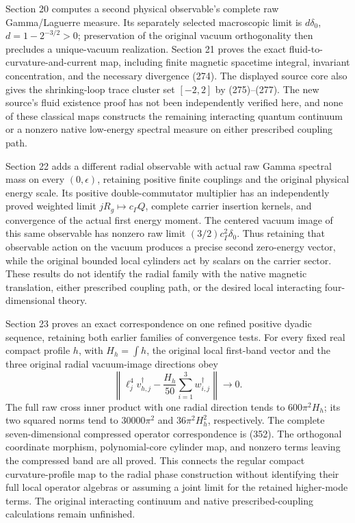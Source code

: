 \documentclass[
  11pt,
]{article}
\begin{document}
Section 20 computes a second physical observable's complete raw
Gamma/Laguerre measure. Its separately selected macroscopic limit is
\(d\delta_0\), \(d=1-2^{-3/2}>0\); preservation of the original vacuum
orthogonality then precludes a unique-vacuum realization. Section 21
proves the exact fluid-to-curvature-and-current map, including finite
magnetic spacetime integral, invariant concentration, and the necessary
divergence (274). The displayed source core also gives the
shrinking-loop trace cluster set \([-2,2]\) by (275)--(277). The new
source's fluid existence proof has not been independently verified here,
and none of these classical maps constructs the remaining interacting
quantum continuum or a nonzero native low-energy spectral measure on
either prescribed coupling path.

Section 22 adds a different radial observable with actual raw Gamma
spectral mass on every \((0,\epsilon)\), retaining positive finite
couplings and the original physical energy scale. Its positive
double-commutator multiplier has an independently proved weighted limit
\(jR_g\mapsto c_\Gamma Q\), complete carrier insertion kernels, and
convergence of the actual first energy moment. The centered vacuum image
of this same observable has nonzero raw limit
\((3/2)c_\Gamma^2\delta_0\). Thus retaining that observable action on
the vacuum produces a precise second zero-energy vector, while the
original bounded local cylinders act by scalars on the carrier sector.
These results do not identify the radial family with the native magnetic
translation, either prescribed coupling path, or the desired local
interacting four-dimensional theory.

Section 23 proves an exact correspondence on one refined positive dyadic
sequence, retaining both earlier families of convergence tests. For
every fixed real compact profile \(h\), with \(H_h=\int h\), the
original local first-band vector and the three original radial
vacuum-image directions obey \[
 \left\|\ell_j^4v_{h,j}^{\dagger}
       -\frac{H_h}{50}\sum_{i=1}^3w_{i,j}^{\dagger}\right\|\to0.
\] The full raw cross inner product with one radial direction tends to
\(600\pi^2H_h\); its two squared norms tend to \(30000\pi^2\) and
\(36\pi^2H_h^2\), respectively. The complete seven-dimensional
compressed operator correspondence is (352). The orthogonal coordinate
morphism, polynomial-core cylinder map, and nonzero terms leaving the
compressed band are all proved. This connects the regular compact
curvature-profile map to the radial phase construction without
identifying their full local operator algebras or assuming a joint limit
for the retained higher-mode terms. The original interacting continuum
and native prescribed-coupling calculations remain unfinished.
\end{document}
